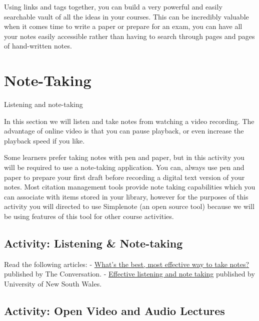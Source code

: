 \documentclass[
]{book}
\theoremstyle{definition}
\theoremstyle{definition}
\theoremstyle{definition}
\theoremstyle{definition}
\theoremstyle{remark}
\begin{document}
Using links and tags together, you can build a very powerful and easily searchable vault of all the ideas in your courses. This can be incredibly valuable when it comes time to write a paper or prepare for an exam, you can have all your notes easily accessible rather than having to search through pages and pages of hand-written notes.

\hypertarget{note-taking}{%
\section{Note-Taking}\label{note-taking}}

Listening and note-taking

In this section we will listen and take notes from watching a video recording. The advantage of online video is that you can pause playback, or even increase the playback speed if you like.

Some learners prefer taking notes with pen and paper, but in this activity you will be required to use a note-taking application. You can, always use pen and paper to prepare your first draft before recording a digital text version of your notes. Most citation management tools provide note taking capabilities which you can associate with items stored in your library, however for the purposes of this activity you will directed to use Simplenote (an open source tool) because we will be using features of this tool for other course activities.

\hypertarget{activity-listening-note-taking}{%
\subsection*{Activity: Listening \& Note-taking}\label{activity-listening-note-taking}}

\begin{reflect}
Read the following articles:
- \href{https://theconversation.com/whats-the-best-most-effective-way-to-take-notes-41961}{What's the best, most effective way to take notes?} published by The Conversation.
- \href{https://www.student.unsw.edu.au/note-taking-skills}{Effective listening and note taking} published by University of New South Wales.
\end{reflect}

\hypertarget{activity-open-video-and-audio-lectures}{%
\subsection*{Activity: Open Video and Audio Lectures}\label{activity-open-video-and-audio-lectures}}
\end{document}
